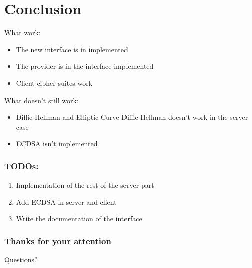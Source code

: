 \section{Conclusion}

\begin{frame}

\underline{What work}:
\begin{itemize}
  \item The new interface is in \embtls implemented
  \item The provider is in the interface implemented
  \item Client cipher suites work
\end{itemize}

\vspace{0.25cm}

\underline{What doesn't still work}:
\begin{itemize}
  \item Diffie-Hellman and Elliptic Curve Diffie-Hellman doesn't work in the
  server case
  \item ECDSA isn't implemented
\end{itemize}

\end{frame}

\begin{frame}

\frametitle{TODOs:}

\begin{enumerate}
  \item Implementation of the rest of the server part
  \item Add ECDSA in server and client
  \item Write the documentation of the interface
\end{enumerate}

\end{frame}

\begin{frame}

\frametitle{Thanks for your attention}

\begin{center}

Questions?

\end{center}

\end{frame}
